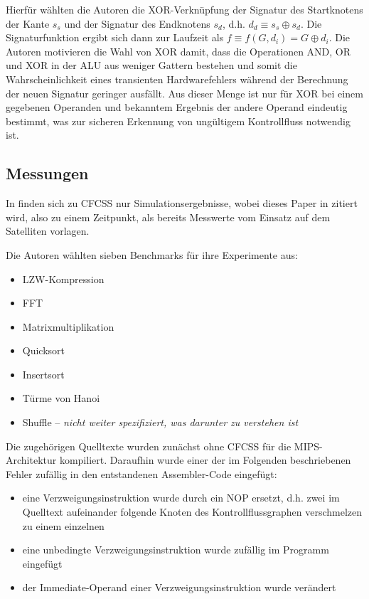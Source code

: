 \documentclass[11pt]{article}
\begin{document}
Hierfür wählten die Autoren die XOR-Verknüpfung der Signatur des Startknotens
der Kante $s_s$ und der Signatur des Endknotens $s_d$, d.h. $d_d \equiv s_s
\oplus s_d$. Die Signaturfunktion ergibt sich dann zur Laufzeit als $f \equiv
f(G, d_i) = G \oplus d_i$.  Die Autoren motivieren die Wahl von XOR damit, dass
die Operationen AND, OR und XOR in der ALU aus weniger Gattern bestehen und
somit die Wahrscheinlichkeit eines transienten Hardwarefehlers während der
Berechnung der neuen Signatur geringer ausfällt. Aus dieser Menge ist nur für
XOR bei einem gegebenen Operanden und bekanntem Ergebnis der andere Operand
eindeutig bestimmt, was zur sicheren Erkennung von ungültigem Kontrollfluss
notwendig ist.

\subsection{Messungen}

In \cite{oh-2002-control} finden sich zu CFCSS nur Simulationsergebnisse, wobei
dieses Paper in \cite{argos-2002-lessons} zitiert wird, also zu einem
Zeitpunkt, als bereits Messwerte vom Einsatz auf dem Satelliten vorlagen.

Die Autoren wählten sieben Benchmarks für ihre Experimente aus:

\begin{itemize}
  \item LZW-Kompression
  \item FFT
  \item Matrixmultiplikation
  \item Quicksort
  \item Insertsort
  \item Türme von Hanoi
  \item Shuffle – \emph{nicht weiter spezifiziert, was darunter zu verstehen ist}
\end{itemize}

Die zugehörigen Quelltexte wurden zunächst ohne CFCSS für die MIPS-Architektur
kompiliert. Daraufhin wurde einer der im Folgenden beschriebenen Fehler
zufällig in den entstandenen Assembler-Code eingefügt:

\begin{itemize}
  \item eine Verzweigungsinstruktion wurde durch ein NOP ersetzt,
        d.h. zwei im Quelltext aufeinander folgende Knoten des Kontrollflussgraphen
        verschmelzen zu einem einzelnen
  \item eine unbedingte Verzweigungsinstruktion wurde zufällig im Programm eingefügt
  \item der Immediate-Operand einer Verzweigungsinstruktion wurde verändert
\end{itemize}
\end{document}
